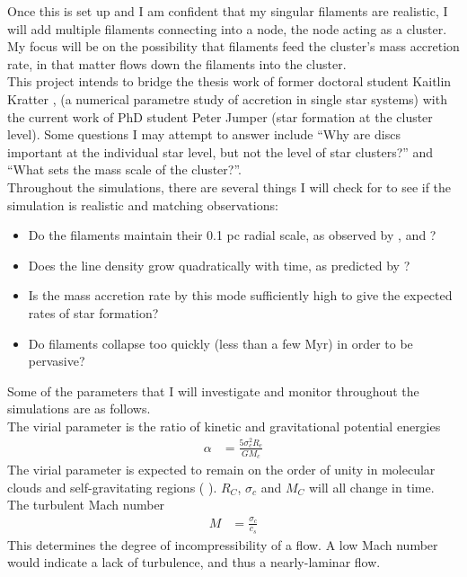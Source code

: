 \documentclass[a4paper,12pt]{article}
\begin{document}
Once this is set up and I am confident that my singular filaments are realistic, I will add multiple filaments connecting into a node, the node acting as a cluster. My focus will be on the possibility that filaments feed the cluster's mass accretion rate, in that matter flows down the filaments into the cluster.\\

This project intends to bridge the thesis work of former doctoral student Kaitlin Kratter \citep{kra10}, (a numerical parametre study of accretion in single star systems) with the current work of PhD student Peter Jumper (star formation at the cluster level). Some questions I may attempt to answer include ``Why are discs important at the individual star level, but not the level of star clusters?'' and ``What sets the mass scale of the cluster?''.\\

Throughout the simulations, there are several things I will check for to see if the simulation is realistic and matching observations:

\begin{itemize}
\item Do the filaments maintain their 0.1 pc radial scale, as observed by \cite{fm12}, \cite{arz11} and \cite{hen13}? 
\item Does the line density grow quadratically with time, as predicted by \cite{mat14}?
\item Is the mass accretion rate by this mode sufficiently high to give the expected rates of star formation?
\item Do filaments collapse too quickly (less than a few Myr) in order to be pervasive?
\end{itemize}

Some of the parameters that I will investigate and monitor throughout the simulations are as follows.\\

The virial parameter is the ratio of kinetic and gravitational potential energies
\begin{align}
\alpha &= \frac{5\sigma_c^2R_c}{GM_c}
\end{align} The virial parameter is expected to remain on the order of unity in molecular clouds and self-gravitating regions (\citep{bm92} \citep{kau13}). $R_C$, $\sigma_c$ and $M_C$ will all change in time.\\

The turbulent Mach number
\begin{align}
M &= \frac{\sigma_c}{c_s}
\end{align} This determines the degree of incompressibility of a flow. A low Mach number would indicate a lack of turbulence, and thus a nearly-laminar flow.\\
\end{document}
